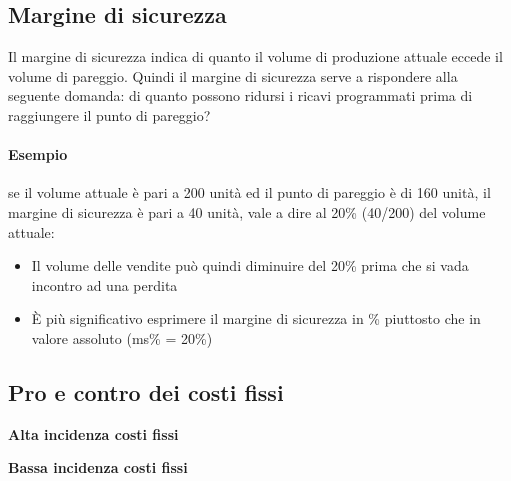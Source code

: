 \subsection{Margine di sicurezza}
Il margine di sicurezza indica di quanto il volume di produzione attuale eccede il
volume di pareggio. Quindi il margine di sicurezza serve a rispondere alla seguente domanda: di
quanto possono ridursi i ricavi programmati prima di raggiungere il punto di
pareggio?

\paragraph{Esempio} se il volume attuale è pari a 200 unità ed il punto di pareggio è di
160 unità, il margine di sicurezza è pari a 40 unità, vale a dire al 20\% (40/200)
del volume attuale:
\begin{itemize}
	\item Il volume delle vendite può quindi diminuire del 20\% prima che si vada
	incontro ad una perdita
	\item È più significativo esprimere il margine di sicurezza in \% piuttosto che in
	valore assoluto (ms\% = 20\%)
\end{itemize}

\subsection{Pro e contro dei costi fissi}
\begin{multicols}{2}
	\begin{center}
		\textbf{Alta incidenza costi fissi}
	\end{center}
	\vfill\null\columnbreak
	\begin{center}
		\textbf{Bassa incidenza costi fissi}
	\end{center}
\end{multicols}

